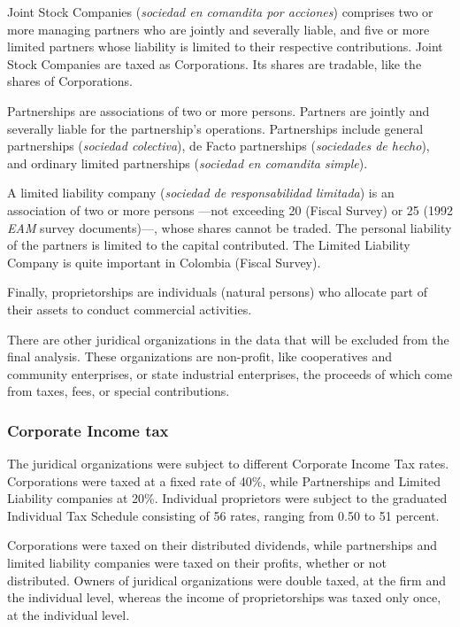 \documentclass[
  12pt]{article}
\theoremstyle{definition}
\theoremstyle{remark}
\begin{document}
Joint Stock Companies (\emph{sociedad en comandita por acciones})
comprises two or more managing partners who are jointly and severally
liable, and five or more limited partners whose liability is limited to
their respective contributions. Joint Stock Companies are taxed as
Corporations. Its shares are tradable, like the shares of Corporations.

Partnerships are associations of two or more persons. Partners are
jointly and severally liable for the partnership's operations.
Partnerships include general partnerships (\emph{sociedad colectiva}),
de Facto partnerships (\emph{sociedades de hecho}), and ordinary limited
partnerships (\emph{sociedad en comandita simple}).

A limited liability company (\emph{sociedad de responsabilidad
limitada}) is an association of two or more persons ---not exceeding 20
(Fiscal Survey) or 25 (1992 \emph{EAM} survey documents)---, whose
shares cannot be traded. The personal liability of the partners is
limited to the capital contributed. The Limited Liability Company is
quite important in Colombia (Fiscal Survey).

Finally, proprietorships are individuals (natural persons) who allocate
part of their assets to conduct commercial activities.

There are other juridical organizations in the data that will be
excluded from the final analysis. These organizations are non-profit,
like cooperatives and community enterprises, or state industrial
enterprises, the proceeds of which come from taxes, fees, or special
contributions.

\subsubsection{Corporate Income tax}\label{corporate-income-tax}

The juridical organizations were subject to different Corporate Income
Tax rates. Corporations were taxed at a fixed rate of 40\%, while
Partnerships and Limited Liability companies at 20\%. Individual
proprietors were subject to the graduated Individual Tax Schedule
consisting of 56 rates, ranging from 0.50 to 51 percent.

Corporations were taxed on their distributed dividends, while
partnerships and limited liability companies were taxed on their
profits, whether or not distributed. Owners of juridical organizations
were double taxed, at the firm and the individual level, whereas the
income of proprietorships was taxed only once, at the individual level.
\end{document}
